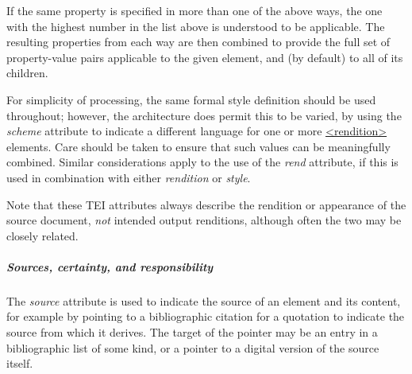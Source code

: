 If the same property is specified in more than one of the above ways, the one with the highest number in the list above is understood to be applicable. The resulting properties from each way are then combined to provide the full set of property-value pairs applicable to the given element, and (by default) to all of its children. \par
For simplicity of processing, the same formal style definition should be used throughout; however, the architecture does permit this to be varied, by using the {\itshape scheme} attribute to indicate a different language for one or more \hyperref[TEI.rendition]{<rendition>} elements. Care should be taken to ensure that such values can be meaningfully combined. Similar considerations apply to the use of the {\itshape rend} attribute, if this is used in combination with either {\itshape rendition} or {\itshape style}.\par
Note that these TEI attributes always describe the rendition or appearance of the source document, \textit{not} intended output renditions, although often the two may be closely related.
\subparagraph[{Sources, certainty, and responsibility}]{Sources, certainty, and responsibility}\label{STGAso}\par
The {\itshape source} attribute is used to indicate the source of an element and its content, for example by pointing to a bibliographic citation for a quotation to indicate the source from which it derives. The target of the pointer may be an entry in a bibliographic list of some kind, or a pointer to a digital version of the source itself.\par
